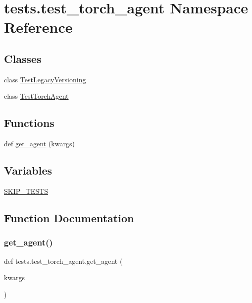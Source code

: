 \hypertarget{namespacetests_1_1test__torch__agent}{}\section{tests.\+test\+\_\+torch\+\_\+agent Namespace Reference}
\label{namespacetests_1_1test__torch__agent}
\subsection*{Classes}
\begin{DoxyCompactItemize}
\item 
class \hyperlink{classtests_1_1test__torch__agent_1_1TestLegacyVersioning}{Test\+Legacy\+Versioning}
\item 
class \hyperlink{classtests_1_1test__torch__agent_1_1TestTorchAgent}{Test\+Torch\+Agent}
\end{DoxyCompactItemize}
\subsection*{Functions}
\begin{DoxyCompactItemize}
\item 
def \hyperlink{namespacetests_1_1test__torch__agent_ae929d109305aaea29fbfa13ecf1f32e9}{get\+\_\+agent} (kwargs)
\end{DoxyCompactItemize}
\subsection*{Variables}
\begin{DoxyCompactItemize}
\item 
\hyperlink{namespacetests_1_1test__torch__agent_a0ea22379520e501f5766757405f3920d}{S\+K\+I\+P\+\_\+\+T\+E\+S\+TS}
\end{DoxyCompactItemize}


\subsection{Function Documentation}
\mbox{\label{namespacetests_1_1test__torch__agent_ae929d109305aaea29fbfa13ecf1f32e9}} 
\subsubsection{\texorpdfstring{get\+\_\+agent()}{get\_agent()}}
{\footnotesize\ttfamily def tests.\+test\+\_\+torch\+\_\+agent.\+get\+\_\+agent (\begin{DoxyParamCaption}\item[{}]{kwargs }\end{DoxyParamCaption})}

